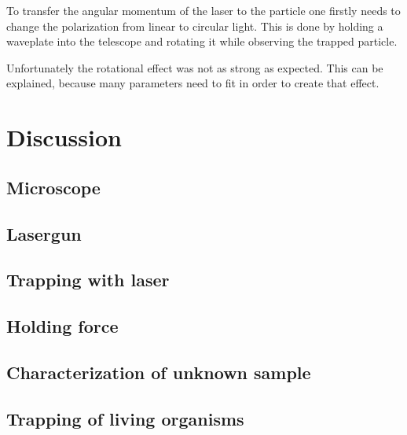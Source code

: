 \documentclass[12pt,english,ngerman]{scrartcl}
\begin{document}
To transfer the angular momentum of the laser to the particle one firstly needs
to change the polarization from linear to circular light. This is done by
holding a waveplate into the telescope and rotating it while observing the
trapped particle.


Unfortunately the rotational effect was not as strong as expected. This can be
explained, because many parameters need to fit in order to create that effect.


\section{Discussion}\label{sec:diskussion}

\subsection{Microscope}

\subsection{Lasergun}

\subsection{Trapping with laser}

\subsection{Holding force}

\subsection{Characterization of unknown sample}

\subsection{Trapping of living organisms}
\end{document}

